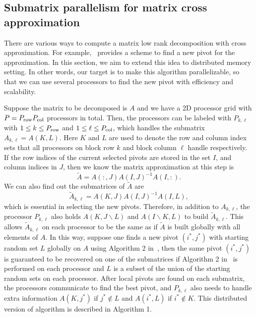 \documentclass[11pt,a4paper,review]{siamart220329}
\begin{document}
\subsection{Submatrix parallelism for matrix cross approximation}
There are various ways to compute a matrix low rank decomposition with cross approximation. For example,~\cite[Algorithm 2]{dolgov2020parallel} provides a scheme to find a new pivot for the approximation. In this section, we aim to extend this idea to distributed memory setting. In other words, our target is to make this algorithm parallelizable, so that we can use several processors to find the new pivot with efficiency and scalability.

Suppose the matrix to be decomposed is $A$ and we have a 2D processor grid with $P = P_{\rm row}P_{\rm col}$ processors in total. Then, the processors can be labeled with $P_{k,\ell}$ with $1 \le k \le P_{\rm row}$ and $1 \le \ell \le P_{\rm col}$, which handles the submatrix $A_{k,\ell} = A(K,L)$. Here $K$ and $L$ are used to denote the row and column index sets that all processors on block row $k$ and block column $\ell$ handle respectively. If the row indices of the current selected pivots are stored in the set $I$, and column indices in $J$, then we know the matrix approximation at this step is 
\[ \tilde{A} = A(:,J)A(I,J)^{-1}A(I,:). \]
We can also find out the submatrices of $\tilde{A}$ are
\[ \tilde{A}_{k,\ell} =  A(K,J)A(I,J)^{-1}A(I,L), \]
which is essential in selecting the new pivots. Therefore, in addition to $A_{k,\ell}$, the processor $P_{k,\ell}$ also holds $A(K,J\backslash L)$ and $A(I \backslash K,L)$ to build $\tilde{A}_{k,\ell}$. This allows $\tilde{A}_{k,\ell}$ on each processor to be the same as if $\tilde{A}$ is built globally with all elements of $A$. In this way, suppose one finds a new pivot $(i^*,j^*)$ with starting random set $L$ globally on $A$ using Algorithm 2 in~\cite{dolgov2020parallel}, then the same pivot $(i^*,j^*)$ is guaranteed to be recovered on one of the submatrices if Algorithm 2 in~\cite{dolgov2020parallel} is performed on each processor and $L$ is a subset of the union of the starting random sets on each processor. After local pivots are found on each submatrix, the processors communicate to find the best pivot, and $P_{k,\ell}$ also needs to handle extra information $A(K,j^*)$ if $j^* \notin L$ and $A(i^*,L)$ if $i^* \notin K$. This distributed version of algorithm is described in Algorithm 1.
\end{document}
